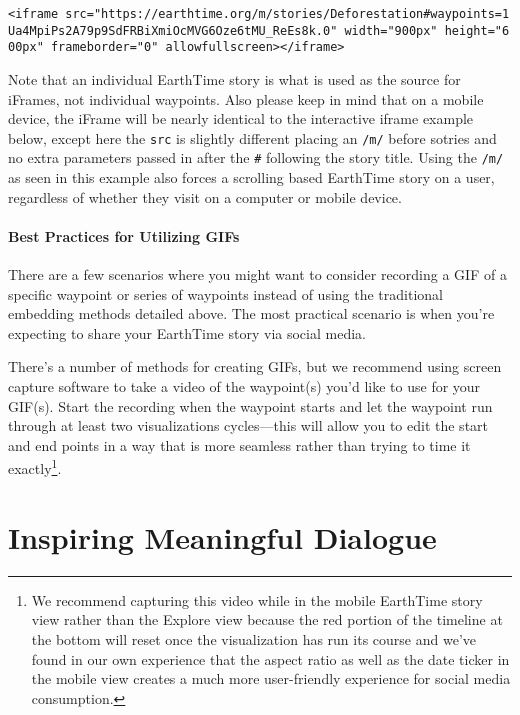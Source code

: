 \documentclass[
  12pt,
]{krantz}
\begin{document}
\texttt{\textless{}iframe\ src="https://earthtime.org/m/stories/Deforestation\#waypoints=1Ua4MpiPs2A79p9SdFRBiXmiOcMVG6Oze6tMU\_ReEs8k.0"\ width="900px"\ height="600px"\ frameborder="0"\ allowfullscreen\textgreater{}\textless{}/iframe\textgreater{}}

Note that an individual EarthTime story is what is used as the source for iFrames, not individual waypoints. Also please keep in mind that on a mobile device, the iFrame will be nearly identical to the interactive iframe example below, except here the \texttt{src} is slightly different placing an \texttt{/m/} before sotries and no extra parameters passed in after the \texttt{\#} following the story title. Using the \texttt{/m/} as seen in this example also forces a scrolling based EarthTime story on a user, regardless of whether they visit on a computer or mobile device.

\hypertarget{best-practices-for-utilizing-gifs}{%
\subsection{Best Practices for Utilizing GIFs}\label{best-practices-for-utilizing-gifs}}

There are a few scenarios where you might want to consider recording a GIF of a specific waypoint or series of waypoints instead of using the traditional embedding methods detailed above. The most practical scenario is when you're expecting to share your EarthTime story via social media.

There's a number of methods for creating GIFs, but we recommend using screen capture software to take a video of the waypoint(s) you'd like to use for your GIF(s). Start the recording when the waypoint starts and let the waypoint run through at least two visualizations cycles---this will allow you to edit the start and end points in a way that is more seamless rather than trying to time it exactly\footnote{We recommend capturing this video while in the mobile EarthTime story view rather than the Explore view because the red portion of the timeline at the bottom will reset once the visualization has run its course and we've found in our own experience that the aspect ratio as well as the date ticker in the mobile view creates a much more user-friendly experience for social media consumption.}.

\hypertarget{part-inspiring-meaningful-dialogue}{%
\part{Inspiring Meaningful Dialogue}\label{part-inspiring-meaningful-dialogue}}
\end{document}
